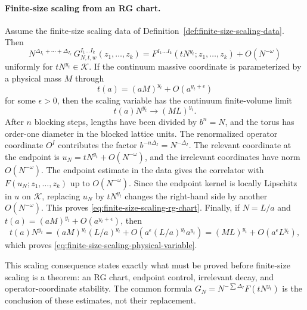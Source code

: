 \paragraph{Finite-size scaling from an RG chart.}
Assume the finite-size scaling data of
Definition~\ref{def:finite-size-scaling-data}.  Then
\begin{equation}
  N^{\Delta_{I_1}+\cdots+\Delta_{I_k}}\,
  G_{N,t,w}^{I_1\ldots I_k}(z_1,\ldots,z_k)
  =
  F^{I_1\ldots I_k}
    (tN^{y_t};z_1,\ldots,z_k)
  +
  O(N^{-\omega})
  \label{eq:finite-size-scaling-rg-chart}
\end{equation}
uniformly for \(tN^{y_t}\in\mathcal K\).  If the continuum massive
coordinate is parameterized by a physical mass \(M\) through
\[
  t(a)=(aM)^{y_t}+O(a^{y_t+\epsilon})
\]
for some \(\epsilon>0\), then the scaling variable has the continuum
finite-volume limit
\begin{equation}
  t(a)N^{y_t}\to (ML)^{y_t}.
  \label{eq:finite-size-scaling-physical-variable}
\end{equation}
After \(n\) blocking steps, lengths have been divided by \(b^n=N\), and the
torus has order-one diameter in the blocked lattice units.  The
renormalized operator coordinate \(O^I\) contributes the factor
\(b^{-n\Delta_I}=N^{-\Delta_I}\).  The relevant coordinate at the endpoint
is \(u_N=tN^{y_t}+O(N^{-\omega})\), and the irrelevant coordinates have
norm \(O(N^{-\omega})\).  The endpoint estimate in the data gives the
correlator with \(F(u_N;z_1,\ldots,z_k)\) up to \(O(N^{-\omega})\).
Since the endpoint kernel is locally Lipschitz in \(u\) on
\(\mathcal K\), replacing \(u_N\) by \(tN^{y_t}\) changes the right-hand
side by another \(O(N^{-\omega})\).  This proves
\eqref{eq:finite-size-scaling-rg-chart}.  Finally, if \(N=L/a\) and
\(t(a)=(aM)^{y_t}+O(a^{y_t+\epsilon})\), then
\[
  t(a)N^{y_t}
  =
  (aM)^{y_t}(L/a)^{y_t}
  +
  O(a^\epsilon (L/a)^{y_t}a^{y_t})
  =
  (ML)^{y_t}+O(a^\epsilon L^{y_t}),
\]
which proves \eqref{eq:finite-size-scaling-physical-variable}.

This scaling consequence states exactly what must be proved before finite-size
scaling is a theorem: an RG chart, endpoint control, irrelevant decay, and
operator-coordinate stability.  The common formula
\(G_N=N^{-\sum\Delta_I}F(tN^{y_t})\) is the conclusion of these estimates,
not their replacement.

